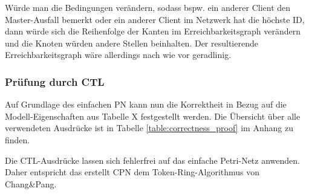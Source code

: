 Würde man die Bedingungen verändern, sodass bspw. ein anderer Client den Master-Ausfall bemerkt oder ein anderer Client im Netzwerk hat die höchste ID, dann würde sich die Reihenfolge der Kanten im Erreichbarkeitsgraph verändern und die Knoten würden andere Stellen beinhalten. Der resultierende Erreichbarkeitsgraph wäre allerdings nach wie vor geradlinig.

\subsubsection{Prüfung durch CTL}
Auf Grundlage des einfachen PN kann nun die Korrektheit in Bezug auf die Modell-Eigenschaften aus Tabelle X festgestellt werden. Die Übersicht über alle verwendeten Ausdrücke ist in Tabelle \ref{table:correctness_proof} im Anhang zu finden.

Die CTL-Ausdrücke lassen sich fehlerfrei auf das einfache Petri-Netz anwenden. Daher entspricht das erstellt CPN dem Token-Ring-Algorithmus von Chang\&Pang.
